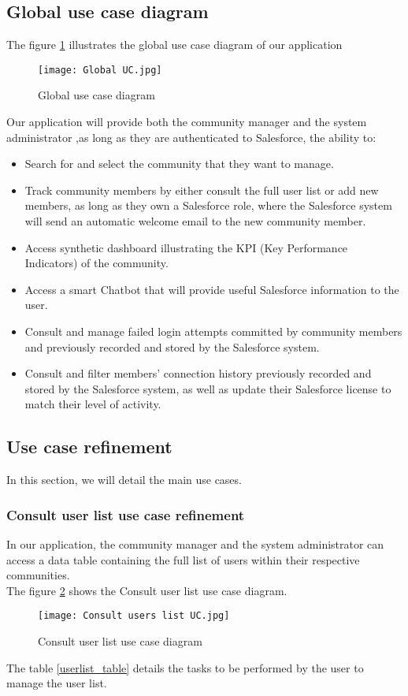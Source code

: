 \subsection{Global use case diagram}
The figure \ref{global_uc} illustrates the global use case diagram of our application
\begin{figure}[H]%
    \center   
    \texttt{[image: Global UC.jpg]}
    \caption{Global use case diagram}
    \label{global_uc}
\end{figure}
Our application will provide both the community manager and the system administrator ,as long as they are authenticated to Salesforce, the ability to:
\begin{itemize}
\item Search for and select the community that they want to manage.
\item Track community members by either consult the full user list or add new members, as long as they own a Salesforce role, where the Salesforce system will send an automatic welcome email to the new community member.
\item Access synthetic dashboard illustrating the KPI (Key Performance Indicators) of the community.
\item Access a smart Chatbot that will provide useful Salesforce information to the user.
\item Consult and manage failed login attempts committed by community members and previously recorded and stored by the Salesforce system.
\item Consult and filter members' connection history previously recorded and stored by the Salesforce system, as well as update their Salesforce license to match their level of activity.
\end{itemize}
\subsection{Use case refinement}
In this section, we will detail the main use cases.
\subsubsection{Consult user list use case refinement}
In our application, the community manager and the system administrator can access a data table containing the full list of users within their respective communities.\\
The figure \ref{userlist_uc} shows the Consult user list use case diagram.
\begin{figure}[H]%
    \center   
    \texttt{[image: Consult users list UC.jpg]}
    \caption{Consult user list use case diagram}
    \label{userlist_uc}
\end{figure}
The table \ref{userlist_table} details the tasks to be performed by the user to manage the user list.

